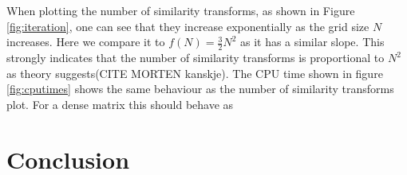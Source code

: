 \documentclass[twocolumn]{aastex62}
\begin{document}
When plotting the number of similarity transforms, as shown in Figure \ref{fig:iteration}, one can see that they increase exponentially as the grid size $N$ increases. Here we compare it to $f(N) =\frac{3}{2}N^2$ as it has a similar slope. This strongly indicates that the number of similarity transforms is proportional to $N^2$ as theory suggests(CITE MORTEN kanskje). The CPU time shown in figure \ref{fig:cputimes} shows the same behaviour as the number of similarity transforms plot. For a dense matrix this should behave as 


\section{Conclusion} \label{sec:conclusion}


\begin{thebibliography}{}
\end{thebibliography}
\end{document}
